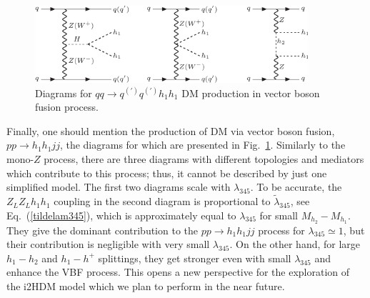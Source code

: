 \documentclass[12pt,a4paper]{article}
\providecommand{\DIFaddtex}[1]{{\protect\color{blue}\uwave{#1}}} %
\providecommand{\DIFaddbegin}{} %
\providecommand{\DIFdelbegin}{} %
\providecommand{\DIFdelend}{} %
\providecommand{\DIFaddbeginFL}{} %
\providecommand{\DIFaddendFL}{} %
\providecommand{\DIFadd}[1]{\texorpdfstring{\DIFaddtex{#1}}{#1}} %
\begin{document}
\DIFdelbegin %
\DIFdelend \DIFaddbegin \subsubsection{\DIFadd{Vector boson fusion}}

\begin{figure}[h!]
\begin{center}
\includegraphics[width=0.9\textwidth]{fd-vbf.pdf} 
\DIFaddendFL \caption{Diagrams for $qq\to q^{(')}q^{(')} h_1 h_1$ DM production in vector boson
  fusion process.}
\label{fig:fd-vbf}
\DIFaddbeginFL \end{center}
\DIFaddendFL \end{figure}
%
Finally, one should mention the production of DM via vector boson fusion, $pp\to h_1 h_1 jj$, the diagrams for which are
presented in Fig.~\ref{fig:fd-vbf}.
Similarly to the mono-$Z$ process, there are three diagrams with different
topologies and mediators which contribute to this process; thus,
it cannot be described by  just one simplified model.
The first two diagrams scale with $\lambda_{345}$.
To be accurate, the $Z_L Z_L h_1 h_1$ coupling in the second diagram is proportional to 
$\tilde\lambda_{345}$, see Eq.~(\ref{tildelam345}), which is approximately equal to $\lambda_{345}$ for small 
$M_{h_2}-M_{h_1}$.
They give the dominant contribution to the  $pp\to h_1 h_1 jj$ process for $\lambda_{345}\simeq 1$,
but their contribution is negligible with very small $\lambda_{345}$.
On the other hand, for large $h_1-h_2$ and $h_1-h^+$ splittings,
they get stronger even with small $\lambda_{345}$ and enhance the VBF process.
This opens a new  perspective for the exploration of the i2HDM model 
which we plan to perform in the near future.
\end{document}
